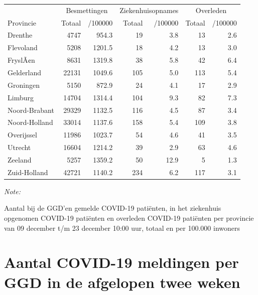 \documentclass[
  english,
  man,floatsintext]{apa6}
\begin{document}
\begin{table}
\centering
\begin{threeparttable}
\begin{tabular}{lrrrrrr}
\toprule
\multicolumn{1}{c}{ } & \multicolumn{2}{c}{Besmettingen} & \multicolumn{2}{c}{Ziekenhuisopnames} & \multicolumn{2}{c}{Overleden} \\
\cmidrule(l{3pt}r{3pt}){2-3} \cmidrule(l{3pt}r{3pt}){4-5} \cmidrule(l{3pt}r{3pt}){6-7}
Provincie & Totaal & /100000 & Totaal & /100000 & Totaal & /100000\\
\midrule
Drenthe & 4747 & 954.3 & 19 & 3.8 & 13 & 2.6\\
Flevoland & 5208 & 1201.5 & 18 & 4.2 & 13 & 3.0\\
FryslÃ¢n & 8631 & 1319.8 & 38 & 5.8 & 42 & 6.4\\
Gelderland & 22131 & 1049.6 & 105 & 5.0 & 113 & 5.4\\
Groningen & 5150 & 872.9 & 24 & 4.1 & 17 & 2.9\\
Limburg & 14704 & 1314.4 & 104 & 9.3 & 82 & 7.3\\
Noord-Brabant & 29329 & 1132.5 & 116 & 4.5 & 87 & 3.4\\
Noord-Holland & 33014 & 1137.6 & 158 & 5.4 & 109 & 3.8\\
Overijssel & 11986 & 1023.7 & 54 & 4.6 & 41 & 3.5\\
Utrecht & 16604 & 1214.2 & 39 & 2.9 & 63 & 4.6\\
Zeeland & 5257 & 1359.2 & 50 & 12.9 & 5 & 1.3\\
Zuid-Holland & 42721 & 1140.2 & 234 & 6.2 & 117 & 3.1\\
\bottomrule
\end{tabular}
\begin{tablenotes}
\item \textit{Note: } 
\item Aantal bij de GGD’en gemelde COVID-19 patiënten, in het ziekenhuis opgenomen COVID-19 patiënten en overleden COVID-19 patiënten per provincie van 09 december t/m 23 december 10:00 uur, totaal en per 100.000 inwoners
\end{tablenotes}
\end{threeparttable}
\end{table}

\newpage

\hypertarget{aantal-covid-19-meldingen-per-ggd-in-de-afgelopen-twee-weken}{%
\section{Aantal COVID-19 meldingen per GGD in de afgelopen twee weken}\label{aantal-covid-19-meldingen-per-ggd-in-de-afgelopen-twee-weken}}
\end{document}
